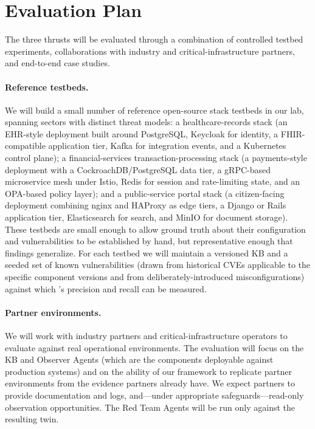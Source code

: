\section{Evaluation Plan}
\label{sec:evaluation}

The three thrusts will be evaluated through a combination of
controlled testbed experiments, collaborations with industry and
critical-infrastructure partners, and end-to-end case studies.

\paragraph{Reference testbeds.}
We will build a small number of reference open-source stack testbeds
in our lab, spanning sectors with distinct threat models: a
healthcare-records stack (an EHR-style deployment built around
PostgreSQL, Keycloak for identity, a FHIR-compatible application
tier, Kafka for integration events, and a Kubernetes control plane);
a financial-services transaction-processing stack (a payments-style
deployment with a CockroachDB/PostgreSQL data tier, a gRPC-based
microservice mesh under Istio, Redis for session and rate-limiting
state, and an OPA-based policy layer); and a public-service portal
stack (a citizen-facing deployment combining nginx and HAProxy as
edge tiers, a Django or Rails application tier, Elasticsearch for
search, and MinIO for document storage). These testbeds are small
enough to allow ground truth about their configuration and
vulnerabilities to be established by hand, but representative enough
that findings generalize. For each testbed we will maintain a
versioned KB and a seeded set of known vulnerabilities (drawn from
historical CVEs applicable to the specific component versions and
from deliberately-introduced misconfigurations) against which
\sysname's precision and recall can be measured.

\paragraph{Partner environments.}
We will work with industry partners and critical-infrastructure
operators to evaluate \sysname against real operational environments.
The evaluation will focus on the KB and Observer Agents (which are
the components deployable against production systems) and on the
ability of our framework to replicate partner environments from the
evidence partners already have. We expect partners to provide
documentation and logs, and---under appropriate safeguards---read-only
observation opportunities. The Red Team Agents will be run only
against the resulting twin.

